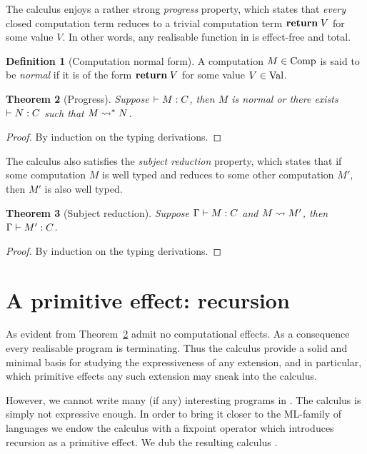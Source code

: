 \documentclass[12pt,phd,lfcs,twoside,openright,logo,leftchapter,normalheadings]{infthesis}
\theoremstyle{plain}
\newtheorem{theorem}{Theorem}[chapter]
\newtheorem{corollary}[theorem]{Corollary}
\theoremstyle{definition}
\newtheorem{definition}[theorem]{Definition}
\begin{document}
%
The calculus enjoys a rather strong \emph{progress} property, which
states that \emph{every} closed computation term reduces to a trivial
computation term $\mathbf{return}\;V$ for some value $V$. In other words, any
realisable function in \BCalc{} is effect-free and total.
%
\begin{definition}[Computation normal form]\label{def:base-language-comp-normal}
  A computation $M \in \textrm{Comp}$ is said to be \emph{normal} if it is
  of the form $\mathbf{return}\; V$ for some value $V \in \textrm{Val}$.
\end{definition}
%
\begin{theorem}[Progress]\label{thm:base-language-progress}
  Suppose $\vdash M : C$, then $M$ is normal or there exists
  $\vdash N : C$ such that $M \leadsto^\ast N$.
\end{theorem}
%
\begin{proof}
  By induction on the typing derivations.
\end{proof}
%
%
The calculus also satisfies the \emph{subject reduction} property,
which states that if some computation $M$ is well typed and reduces to
some other computation $M'$, then $M'$ is also well typed.
%
\begin{theorem}[Subject reduction]\label{thm:base-language-preservation}
  Suppose $\Gamma \vdash M : C$ and $M \leadsto M'$, then
  $\Gamma \vdash M' : C$.
\end{theorem}
%
\begin{proof}
  By induction on the typing derivations.
\end{proof}

\section{A primitive effect: recursion}
\label{sec:base-language-recursion}
%
As evident from Theorem~\ref{thm:base-language-progress} \BCalc{}
admit no computational effects. As a consequence every realisable
program is terminating. Thus the calculus provide a solid and minimal
basis for studying the expressiveness of any extension, and in
particular, which primitive effects any such extension may sneak into
the calculus.

However, we cannot write many (if any) interesting programs in
\BCalc{}. The calculus is simply not expressive enough. In order to
bring it closer to the ML-family of languages we endow the calculus
with a fixpoint operator which introduces recursion as a primitive
effect. We dub the resulting calculus \BCalcRec{}.
%
\end{document}
